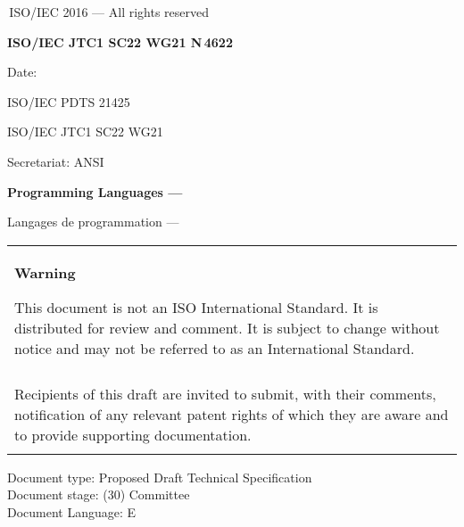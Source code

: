 

\thispagestyle{empty}
{\raisebox{.35ex}{\smaller\copyright}}\,ISO/IEC 2016 --- All rights reserved
\vspace{2ex}

\begin{flushright}
\textbf{ISO/IEC JTC1 SC22 WG21 N\,\LARGE4622}

Date: \reldate

ISO/IEC PDTS 21425

ISO/IEC JTC1 SC22 WG21

Secretariat: ANSI

\end{flushright}

\vfill

\textbf{\LARGE Programming Languages --- \doctitle}

Langages de programmation --- \frtitle

\vfill

\begin{tabular}{|p{\hsize}|}
\hline
\begin{center}
\textbf{Warning}
\end{center}

\vspace{2ex}

This document is not an ISO International Standard. It is distributed
for review and comment. It is subject to change without notice and may
not be referred to as an International Standard.\\\\

Recipients of this draft are invited to submit, with their comments,
notification of any relevant patent rights of which they are aware
and to provide supporting documentation.\\\\
\hline
\end{tabular}

\vfill
\noindent
Document type: Proposed Draft Technical Specification\\
Document stage: (30) Committee\\
Document Language: E
\pagebreak

\thispagestyle{cpppage}

